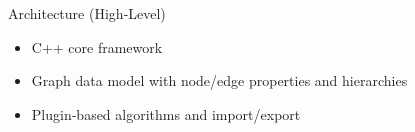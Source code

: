\begin{frame}{Architecture (High‑Level)}
	\begin{itemize}
		\item C++ core framework
		\item Graph data model with node/edge properties and hierarchies
		\item Plugin‑based algorithms and import/export
	\end{itemize}
\end{frame}
